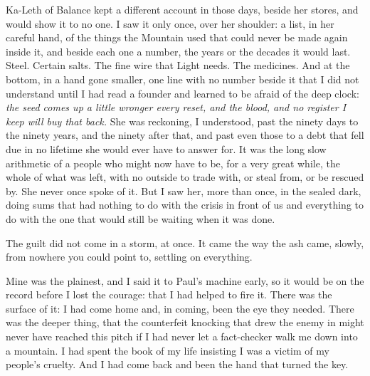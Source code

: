 Ka-Leth of Balance kept a different account in those days, beside her stores, and would show it to no one. I saw it only once, over her shoulder: a list, in her careful hand, of the things the Mountain used that could never be made again inside it, and beside each one a number, the years or the decades it would last. Steel. Certain salts. The fine wire that Light needs. The medicines. And at the bottom, in a hand gone smaller, one line with no number beside it that I did not understand until I had read a founder and learned to be afraid of the deep clock: \emph{the seed comes up a little wronger every reset, and the blood, and no register I keep will buy that back.} She was reckoning, I understood, past the ninety days to the ninety years, and the ninety after that, and past even those to a debt that fell due in no lifetime she would ever have to answer for. It was the long slow arithmetic of a people who might now have to be, for a very great while, the whole of what was left, with no outside to trade with, or steal from, or be rescued by. She never once spoke of it. But I saw her, more than once, in the sealed dark, doing sums that had nothing to do with the crisis in front of us and everything to do with the one that would still be waiting when it was done.\par

\ornament

The guilt did not come in a storm, at once. It came the way the ash came, slowly, from nowhere you could point to, settling on everything.\par

Mine was the plainest, and I said it to Paul's machine early, so it would be on the record before I lost the courage: that I had helped to fire it. There was the surface of it: I had come home and, in coming, been the eye they needed. There was the deeper thing, that the counterfeit knocking that drew the enemy in might never have reached this pitch if I had never let a fact-checker walk me down into a mountain. I had spent the book of my life insisting I was a victim of my people's cruelty. And I had come back and been the hand that turned the key.\par

